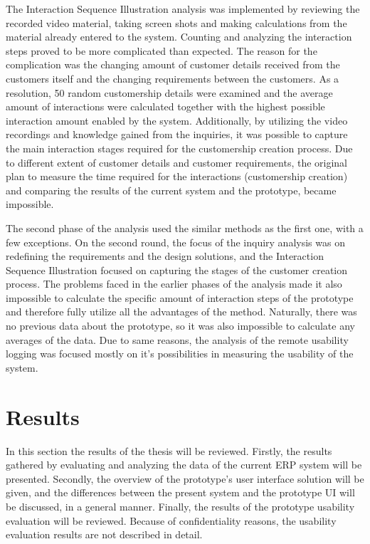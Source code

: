 \documentclass[12pt,a4paper,oneside,pdftex]{report}
\begin{document}
The Interaction Sequence Illustration analysis was implemented by reviewing the recorded video material, taking screen shots  and making calculations from the material already entered to the system. Counting and analyzing the interaction steps proved to be more complicated than expected. The reason for the complication was the changing amount of customer details received from the customers itself and the changing requirements between the customers. As a resolution, 50 random customership details were examined and the average amount of interactions were calculated together with the highest possible interaction amount enabled by the system. Additionally, by utilizing the video recordings and knowledge gained from the inquiries, it was possible to capture the main interaction stages required for the customership creation process. Due to different extent of customer details and customer requirements, the original plan to measure the time required for the interactions (customership creation) and comparing the results of the current system and the prototype, became impossible. 

The second phase of the analysis used the similar methods as the first one, with a few exceptions.  On the second round, the focus of the inquiry analysis was on redefining the requirements and the design solutions, and the Interaction Sequence Illustration focused on capturing the stages of the customer creation process. The problems faced in the earlier phases of the analysis made it also impossible to calculate the specific amount of interaction steps of the prototype and therefore fully utilize all the advantages of the method. Naturally, there was no previous data about the prototype, so it was also impossible to calculate any averages of the data.  Due to same reasons, the analysis of the remote usability logging was focused mostly on it's possibilities in measuring the usability of the system. 


\section{Results}
\label{sec:results}

In this section the results of the thesis will be reviewed. Firstly, the results gathered by evaluating and analyzing the data of the current ERP system will be presented. Secondly, the overview of the prototype's user interface solution will be given, and the differences between the present system and the prototype UI will be discussed, in a general manner. Finally, the results of the prototype usability evaluation will be reviewed. Because of confidentiality reasons, the usability evaluation results are not described in detail.
    
\end{document}
